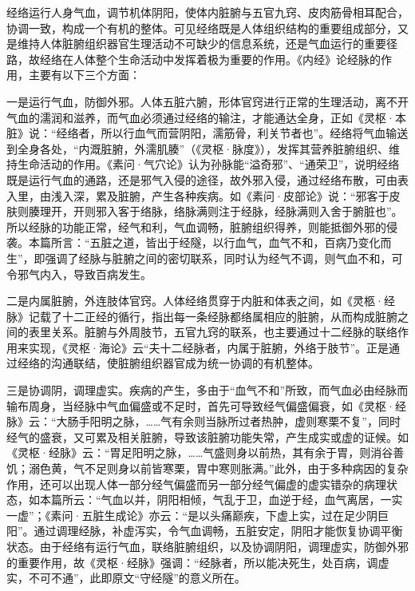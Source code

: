 \documentclass[draft,12pt]{ctexbook}
\begin{document}
经络运行人身气血，调节机体阴阳，使体内脏腑与五官九窍、皮肉筋骨相耳配合，协调一致，构成一个有机的整体。可见经络既是人体组织结构的重要组成部分，又是维持人体脏腑组织器官生理活动不可缺少的信息系统，还是气血运行的重要径路，故经络在人体整个生命活动中发挥着极为重要的作用。《内经》论经脉的作用，主要有以下三个方面：

一是运行气血，防御外邪。人体五脏六腑，形体官窍进行正常的生理活动，离不开气血的濡润和滋养，而气血必须通过经络的输注，才能通达全身，正如《灵枢·本脏》说：“经络者，所以行血气而营阴阳，濡筋骨，利关节者也”。经络将气血输送到全身各处，“内溉脏腑，外濡肌腠”（《灵枢·脉度》），发挥其营养脏腑组织、维持生命活动的作用。《素问·气穴论》认为孙脉能“溢奇邪”、“通荣卫”，说明经络既是运行气血的通路，还是邪气入侵的途径，故外邪入侵，通过经络布散，可由表入里，由浅入深，累及脏腑，产生各种疾病。如《素问·皮部论》说：“邪客于皮肤则腠理开，开则邪入客于络脉，络脉满则注于经脉，经脉满则入舍于腑脏也”。所以经脉的功能正常，经气和利，气血调畅，脏腑组织得养，则能抵御外邪的侵袭。本篇所言：“五脏之道，皆出于经隧，以行血气，血气不和，百病乃变化而生”，即强调了经脉与脏腑之间的密切联系，同时认为经气不调，则气血不和，可令邪气内入，导致百病发生。

二是内属脏腑，外连肢体官窍。人体经络贯穿于内脏和体表之间，如《灵柩·经脉》记载了十二正经的循行，指出每一条经脉都络属相应的脏腑，从而构成脏腑之间的表里关系。脏腑与外周肢节，五官九窍的联系，也主要通过十二经脉的联络作用来实现，《灵枢·海论》云“夫十二经脉者，内属于脏腑，外络于肢节”。正是通过经络的沟通联结，使脏腑组织器官成为统一协调的有机整体。

三是协调阴，调理虚实。疾病的产生，多由于“血气不和”所致，而气血必由经脉而输布周身，当经脉中气血偏盛或不足时，首先可导致经气偏盛偏衰，如《灵枢·经脉》云：“大肠手阳明之脉，……气有余则当脉所过者热肿，虚则寒栗不复”，同时经气的盛衰，又可累及相关脏腑，导致该脏腑功能失常，产生成实或虚的证候。如《灵枢·经脉》云：“胃足阳明之脉，……气盛则身以前热，其有余于胃，则消谷善饥；溺色黄，气不足则身以前皆寒栗，胃中寒则胀满。”此外，由于多种病因的复杂作用，还可以出现人体一部分经气偏盛而另一部分经气偏虚的虚实错杂的病理状态，如本篇所云：“气血以并，阴阳相倾，气乱于卫，血逆于经，血气离居，一实一虚”；《素问·五脏生成论》亦云：“是以头痛巅疾，下虚上实，过在足少阴巨阳”。通过调理经脉，补虚泻实，令气血调畅，五脏安定，阴阳才能恢复协调平衡状态。由于经络有运行气血，联络脏腑组织，以及协调阴阳，调理虚实，防御外邪的重要作用，故《灵枢·经脉》强调：“经脉者，所以能决死生，处百病，调虚实，不可不通”，此即原文“守经隧”的意义所在。

\end{document}
